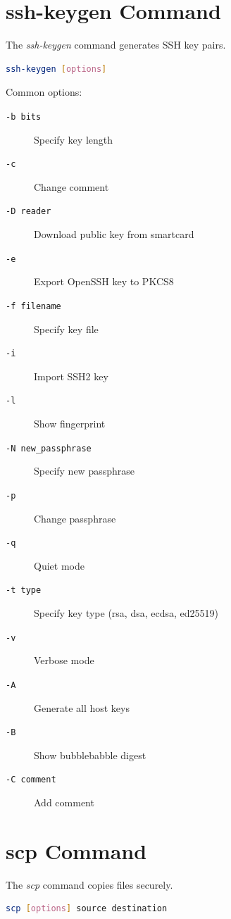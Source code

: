 \documentclass[12pt]{book}
\begin{document}
\section{ssh-keygen Command}

The \textit{ssh-keygen} command generates SSH key pairs.

\begin{lstlisting}[language=bash]
ssh-keygen [options]
\end{lstlisting}

Common options:
\begin{description}
    \item[\texttt{-b bits}] Specify key length
    \item[\texttt{-c}] Change comment
    \item[\texttt{-D reader}] Download public key from smartcard
    \item[\texttt{-e}] Export OpenSSH key to PKCS8
    \item[\texttt{-f filename}] Specify key file
    \item[\texttt{-i}] Import SSH2 key
    \item[\texttt{-l}] Show fingerprint
    \item[\texttt{-N new\_passphrase}] Specify new passphrase
    \item[\texttt{-p}] Change passphrase
    \item[\texttt{-q}] Quiet mode
    \item[\texttt{-t type}] Specify key type (rsa, dsa, ecdsa, ed25519)
    \item[\texttt{-v}] Verbose mode
    \item[\texttt{-A}] Generate all host keys
    \item[\texttt{-B}] Show bubblebabble digest
    \item[\texttt{-C comment}] Add comment
\end{description}

\section{scp Command}

The \textit{scp} command copies files securely.

\begin{lstlisting}[language=bash]
scp [options] source destination
\end{lstlisting}
\end{document}
